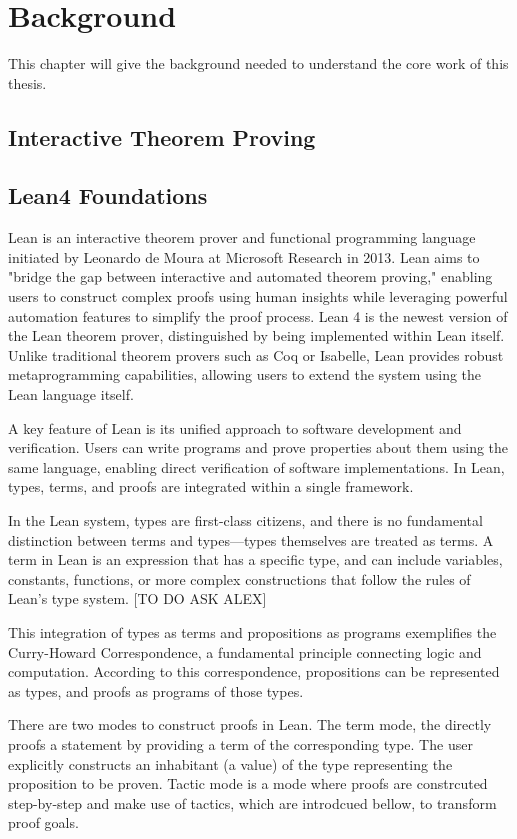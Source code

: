 
\chapter{Background}

This chapter will give the background needed to understand the core work of this thesis. 
\section{Interactive Theorem Proving} 
\section{Lean4 Foundations} 
Lean is an interactive theorem prover and functional programming language initiated by Leonardo de Moura at Microsoft Research in 2013. Lean aims to "bridge the gap between interactive and automated theorem proving," enabling users to construct complex proofs using human insights while leveraging powerful automation features to simplify the proof process.
Lean 4 is the newest version of the Lean theorem prover, distinguished by being implemented within Lean itself. Unlike traditional theorem provers such as Coq or Isabelle, Lean provides robust metaprogramming capabilities, allowing users to extend the system using the Lean language itself.

A key feature of Lean is its unified approach to software development and verification. Users can write programs and prove properties about them using the same language, enabling direct verification of software implementations. In Lean, types, terms, and proofs are integrated within a single framework.

In the Lean system, types are first-class citizens, and there is no fundamental distinction between terms and types—types themselves are treated as terms. A term in Lean is an expression that has a specific type, and can include variables, constants, functions, or more complex constructions that follow the rules of Lean's type system. [TO DO ASK ALEX]

This integration of types as terms and propositions as programs exemplifies the Curry-Howard Correspondence, a fundamental principle connecting logic and computation. According to this correspondence, propositions can be represented as types, and proofs as programs of those types.



There are two modes to construct proofs in Lean. The term mode, the directly proofs a statement by providing a term of the corresponding type. The user explicitly constructs an inhabitant (a value) of the type representing the proposition to be proven. Tactic mode is a mode where proofs are constrcuted step-by-step and make use of tactics, which are introdcued bellow, to transform proof goals. 

